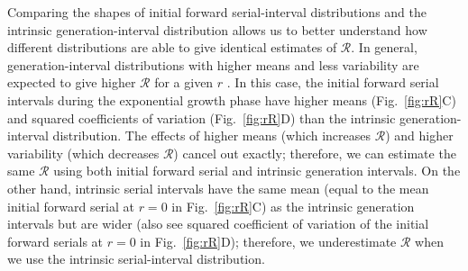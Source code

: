 \documentclass[12pt]{article}
\newcommand{\fref}[1]{Fig.~\ref{fig:#1}}
\newcommand{\RR}{\ensuremath{{\mathcal R}}\xspace}
\begin{document}
Comparing the shapes of initial forward serial-interval distributions and the intrinsic generation-interval distribution allows us to better understand how different distributions are able to give identical estimates of \RR.
In general, generation-interval distributions with higher means and less variability are expected to give higher \RR for a given $r$ \citep{wallinga2007generation, park2019practical}.
In this case, the initial forward serial intervals during the exponential growth phase have higher means (\fref{rR}C) and squared coefficients of variation (\fref{rR}D) than the intrinsic generation-interval distribution.
The effects of higher means (which increases \RR) and higher variability (which decreases \RR) cancel out exactly;
therefore, we can estimate the same \RR using both initial forward serial and intrinsic generation intervals.
On the other hand, intrinsic serial intervals have the same mean (equal to the mean initial forward serial at $r=0$ in \fref{rR}C) as the intrinsic generation intervals but are wider (also see squared coefficient of variation of the initial forward serials at $r=0$ in \fref{rR}D); 
therefore, we underestimate \RR when we use the intrinsic serial-interval distribution.
\end{document}

